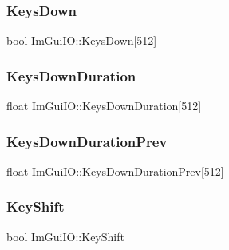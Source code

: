 \hypertarget{struct_im_gui_i_o_a182f42d74cb25a4cf611cc0f776b3848}{}\label{struct_im_gui_i_o_a182f42d74cb25a4cf611cc0f776b3848} 
\subsubsection{\texorpdfstring{Keys\+Down}{KeysDown}}
{\footnotesize\ttfamily bool Im\+Gui\+I\+O\+::\+Keys\+Down\mbox{[}512\mbox{]}}

\hypertarget{struct_im_gui_i_o_a6f1da2ea6d8e3398d9526fe983cf0a6f}{}\label{struct_im_gui_i_o_a6f1da2ea6d8e3398d9526fe983cf0a6f} 
\subsubsection{\texorpdfstring{Keys\+Down\+Duration}{KeysDownDuration}}
{\footnotesize\ttfamily float Im\+Gui\+I\+O\+::\+Keys\+Down\+Duration\mbox{[}512\mbox{]}}

\hypertarget{struct_im_gui_i_o_ac079dcd415784a08fec74388e18abb97}{}\label{struct_im_gui_i_o_ac079dcd415784a08fec74388e18abb97} 
\subsubsection{\texorpdfstring{Keys\+Down\+Duration\+Prev}{KeysDownDurationPrev}}
{\footnotesize\ttfamily float Im\+Gui\+I\+O\+::\+Keys\+Down\+Duration\+Prev\mbox{[}512\mbox{]}}

\hypertarget{struct_im_gui_i_o_a3c7642214f88862af5b8467f98ac35c9}{}\label{struct_im_gui_i_o_a3c7642214f88862af5b8467f98ac35c9} 
\subsubsection{\texorpdfstring{Key\+Shift}{KeyShift}}
{\footnotesize\ttfamily bool Im\+Gui\+I\+O\+::\+Key\+Shift}

\hypertarget{struct_im_gui_i_o_afda9e11e21b7ba21573671c38d9f4a81}{}\label{struct_im_gui_i_o_afda9e11e21b7ba21573671c38d9f4a81} 
